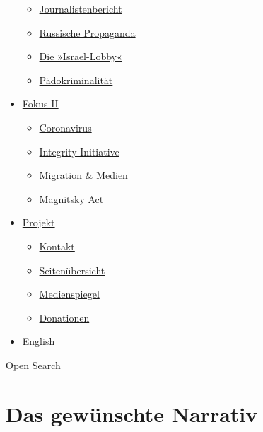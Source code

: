 \begin{itemize}
  \begin{itemize}
  \tightlist
  \item
    \href{https://swprs.org/bericht-eines-journalisten/}{Journalistenbericht}
  \item
    \href{https://swprs.org/russische-propaganda/}{Russische Propaganda}
  \item
    \href{https://swprs.org/die-israel-lobby-fakten-und-mythen/}{Die
    »Israel-Lobby«}
  \item
    \href{https://swprs.org/geopolitik-und-paedokriminalitaet/}{Pädokriminalität}
  \end{itemize}
\item
  \href{https://swprs.org/migration-und-medien/}{Fokus II}

  \begin{itemize}
  \tightlist
  \item
    \href{https://swprs.org/covid-19-hinweis-ii/}{Coronavirus}
  \item
    \href{https://swprs.org/die-integrity-initiative/}{Integrity
    Initiative}
  \item
    \href{https://swprs.org/migration-und-medien/}{Migration \& Medien}
  \item
    \href{https://swprs.org/der-fall-magnitsky/}{Magnitsky Act}
  \end{itemize}
\item
  \href{https://swprs.org/kontakt/}{Projekt}

  \begin{itemize}
  \tightlist
  \item
    \href{https://swprs.org/kontakt/}{Kontakt}
  \item
    \href{https://swprs.org/uebersicht/}{Seitenübersicht}
  \item
    \href{https://swprs.org/medienspiegel/}{Medienspiegel}
  \item
    \href{https://swprs.org/donationen/}{Donationen}
  \end{itemize}
\item
  \href{https://swprs.org/contact/}{English}
\end{itemize}

\protect\hyperlink{}{Open Search}

\hypertarget{das-gewuxfcnschte-narrativ}{%
\section{Das gewünschte Narrativ}\label{das-gewuxfcnschte-narrativ}}

